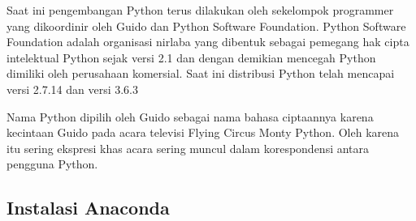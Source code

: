 Saat ini pengembangan Python terus dilakukan oleh sekelompok programmer yang dikoordinir oleh Guido dan Python Software Foundation. Python Software Foundation adalah organisasi nirlaba yang dibentuk sebagai pemegang hak cipta intelektual Python sejak versi 2.1 dan dengan demikian mencegah Python dimiliki oleh perusahaan komersial. Saat ini distribusi Python telah mencapai versi 2.7.14 dan versi 3.6.3

Nama Python dipilih oleh Guido sebagai nama bahasa ciptaannya karena kecintaan Guido pada acara televisi Flying Circus Monty Python. Oleh karena itu sering ekspresi khas acara sering muncul dalam korespondensi antara pengguna Python.
\subsection{Instalasi Anaconda}
